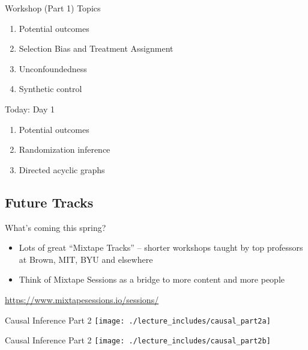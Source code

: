 \documentclass{beamer}
\begin{document}
\begin{frame}{Workshop (Part 1) Topics}

  \begin{enumerate}
    \item Potential outcomes
    \item Selection Bias and Treatment Assignment
    \item Unconfoundedness
    \item Synthetic control
  \end{enumerate}

\end{frame}

\begin{frame}{Today: Day 1}

\begin{enumerate}
\item Potential outcomes
\item Randomization inference
\item Directed acyclic graphs
\end{enumerate}

\end{frame}

\subsection{Future Tracks}

\begin{frame}{What's coming this spring?}

\begin{itemize}
\item Lots of great ``Mixtape Tracks'' -- shorter workshops taught by top professors at Brown, MIT, BYU and elsewhere
\item Think of Mixtape Sessions as a bridge to more content and more people
\end{itemize}

\bigskip

\url{https://www.mixtapesessions.io/sessions/}

\end{frame}

\begin{frame}{Causal Inference Part 2}
  \centering
  \texttt{[image: ./lecture\_includes/causal\_part2a]}
\end{frame}

\begin{frame}{Causal Inference Part 2}
  \centering
  \texttt{[image: ./lecture\_includes/causal\_part2b]}
\end{frame}
\end{document}

